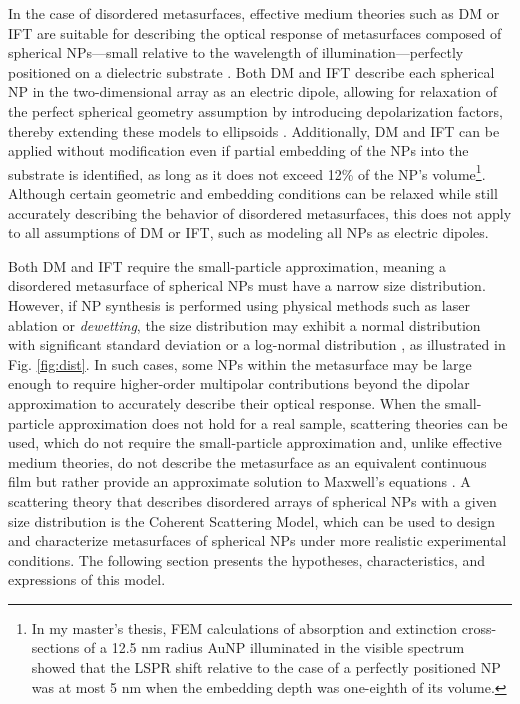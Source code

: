 In the case of disordered metasurfaces, effective medium theories such as DM or IFT are suitable for describing the optical response of metasurfaces composed of spherical NPs—small relative to the wavelength of illumination—perfectly positioned on a dielectric substrate \cite{barrera1991optical,bedeaux_optical_2004}. Both DM and IFT describe each spherical NP in the two-dimensional array as an electric dipole, allowing for relaxation of the perfect spherical geometry assumption by introducing depolarization factors, thereby extending these models to ellipsoids \cite{sihvola_electromagnetic_2008}. Additionally, DM and IFT can be applied without modification even if partial embedding of the NPs into the substrate is identified, as long as it does not exceed 12\% of the NP's volume\footnote{In my master's thesis, FEM calculations of absorption and extinction cross-sections of a 12.5 nm radius AuNP illuminated in the visible spectrum showed that the LSPR shift relative to the case of a perfectly positioned NP was at most 5 nm when the embedding depth was one-eighth of its volume.}. Although certain geometric and embedding conditions can be relaxed while still accurately describing the behavior of disordered metasurfaces, this does not apply to all assumptions of DM or IFT, such as modeling all NPs as electric dipoles.

Both DM and IFT require the small-particle approximation, meaning a disordered metasurface of spherical NPs must have a narrow size distribution. However, if NP synthesis is performed using physical methods such as laser ablation or \textit{dewetting}, the size distribution may exhibit a normal distribution with significant standard deviation \cite{hammad_improving_2023} or a log-normal distribution \cite{wang_formation_2011,vazquez-estrada_optical_2014}, as illustrated in Fig. \ref{fig:dist}. In such cases, some NPs within the metasurface may be large enough to require higher-order multipolar contributions beyond the dipolar approximation to accurately describe their optical response. When the small-particle approximation does not hold for a real sample, scattering theories can be used, which do not require the small-particle approximation and, unlike effective medium theories, do not describe the metasurface as an equivalent continuous film but rather provide an approximate solution to Maxwell's equations \cite{bosi_transmission_1992,reyes2018analytical}. A scattering theory that describes disordered arrays of spherical NPs with a given size distribution is the Coherent Scattering Model, which can be used to design and characterize metasurfaces of spherical NPs under more realistic experimental conditions. The following section presents the hypotheses, characteristics, and expressions of this model.
